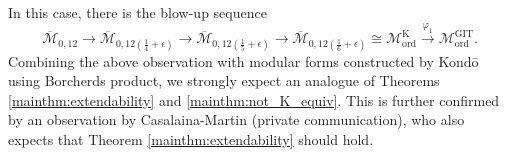 \documentclass[12pt, pdftex]{amsart}
\theoremstyle{plain}
\theoremstyle{definition}
\numberwithin{equation}{section}
\def\ord{\mathrm{ord}}
\def\GIT{\mathrm{GIT}}
\def\K{\mathrm{K}}
\def\M{\mathcal{M}}
\begin{document}
In this case, there is the blow-up sequence 
\[\overline{\M}_{0,12}\to\overline{\M}_{0,12(\frac{1}{4}+\epsilon)}\to\overline{\M}_{0,12(\frac{1}{5}+\epsilon)}\to\overline{\M}_{0,12(\frac{1}{6}+\epsilon)}\cong\M_{\ord}^{\K}\stackrel{\varphi_1}{\to}\M_{\ord}^{\GIT}.\]
Combining the above observation with modular forms constructed by Kond\={o} \cite[Corollary 2.9]{KoNote} using Borcherds product, we strongly expect an analogue of Theorems \ref{mainthm:extendability} and \ref{mainthm:not_K_equiv}.
This is further confirmed by an observation by Casalaina-Martin (private communication), who also expects that Theorem \ref{mainthm:extendability} should hold.
\end{document}
